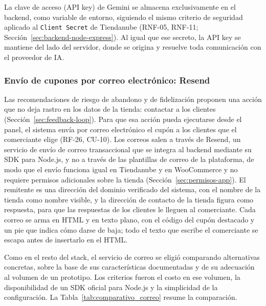 La clave de acceso (API key) de Gemini se almacena exclusivamente en el backend, como variable de entorno, siguiendo el mismo criterio de seguridad aplicado al \texttt{Client Secret} de Tiendanube (RNF-05, RNF-11; Sección~\ref{sec:backend-node-express}). Al igual que ese secreto, la API key se mantiene del lado del servidor, donde se origina y resuelve toda comunicación con el proveedor de IA.

\subsubsection{Envío de cupones por correo electrónico: Resend}
\label{sec:envio-correos}

Las recomendaciones de riesgo de abandono y de fidelización proponen una acción que no deja rastro en los datos de la tienda: contactar a los clientes (Sección~\ref{sec:feedback-loop}). Para que esa acción pueda ejecutarse desde el panel, el sistema envía por correo electrónico el cupón a los clientes que el comerciante elige (RF-26, CU-10). Los correos salen a través de Resend, un servicio de envío de correo transaccional que se integra al backend mediante su SDK para Node.js, y no a través de las plantillas de correo de la plataforma, de modo que el envío funciona igual en Tiendanube y en WooCommerce y no requiere permisos adicionales sobre la tienda (Sección~\ref{sec:permisos-app}). El remitente es una dirección del dominio verificado del sistema, con el nombre de la tienda como nombre visible, y la dirección de contacto de la tienda figura como respuesta, para que las respuestas de los clientes le lleguen al comerciante. Cada correo se arma en HTML y en texto plano, con el código del cupón destacado y un pie que indica cómo darse de baja; todo el texto que escribe el comerciante se escapa antes de insertarlo en el HTML.

Como en el resto del stack, el servicio de correo se eligió comparando alternativas concretas, sobre la base de sus características documentadas y de su adecuación al volumen de un prototipo. Los criterios fueron el costo en ese volumen, la disponibilidad de un SDK oficial para Node.js y la simplicidad de la configuración. La Tabla~\ref{tab:comparativo_correo} resume la comparación.

